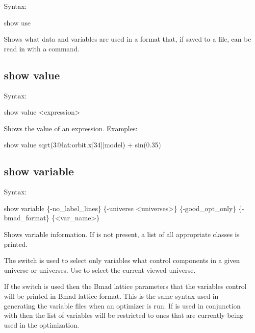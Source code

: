 {{{{{{Syntax:
\begin{example}
  show use
\end{example}

Shows what data and variables are used in a format that, if saved to a file, can be read
in with a  command.


\subsection{show value}
\label{s:show.value}

Syntax:
\begin{example}
  show value <expression>
\end{example}


Shows the value of an expression. Examples:
\begin{example}
  show value sqrt(3@lat:orbit.x[34]|model) + sin(0.35)
\end{example}



\subsection{show variable}
\label{s:show.variable}

Syntax:
\begin{example}
  show variable \{-no_label_lines\} \{-universe <universes>\}            
         \{-good_opt_only\} \{-bmad_format\} \{<var_name>\}
\end{example}


Shows variable information. If  is not present, a list of all appropriate
 classes is printed.

The  switch is used to select only variables what control components in a
given universe or universes. Use  to select the current viewed universe.

If the  switch is used then the Bmad lattice parameters that the \tao
variables control will be printed in Bmad lattice format. This is the same syntax used in
generating the variable files when an optimizer is run. If  is used in
conjunction with  then the list of variables will be restricted to ones
that are currently being used in the optimization.

}}}}}}
